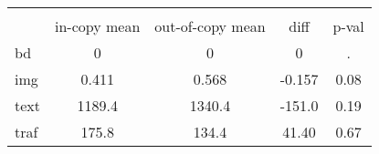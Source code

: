 {
\def\sym#1{\ifmmode^{#1}\else\(^{#1}\)\fi}
\begin{tabular}{l*{1}{cccc}}
\hline\hline
            &            &            &            &            \\
            &in-copy mean&out-of-copy mean&        diff&       p-val\\
\hline
bd          &           0&           0&           0&           .\\
img         &       0.411&       0.568&      -0.157&        0.08\\
text        &      1189.4&      1340.4&      -151.0&        0.19\\
traf        &       175.8&       134.4&       41.40&        0.67\\
\hline\hline
\end{tabular}
}
